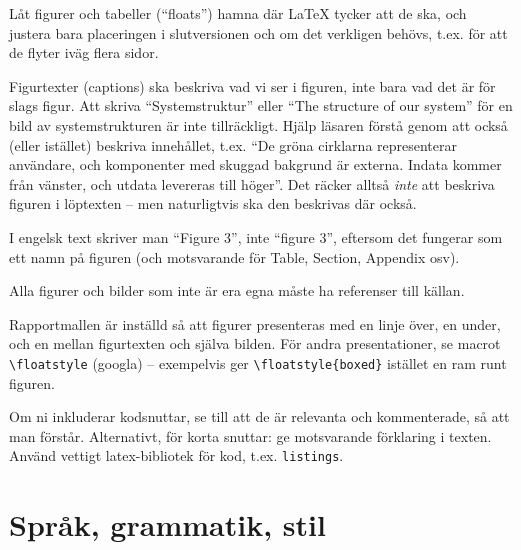 Låt figurer och tabeller (``floats'') hamna där La\TeX{} tycker att de ska, och justera bara placeringen i slutversionen och om det verkligen behövs, t.ex. för att de flyter iväg flera sidor.

Figurtexter (captions) ska beskriva vad vi ser i figuren, inte bara vad det är för slags figur. Att skriva ``Systemstruktur'' eller ``The structure of our system'' för en bild av systemstrukturen är inte tillräckligt. Hjälp läsaren förstå genom att också (eller istället) beskriva innehållet, t.ex. ``De gröna cirklarna representerar användare, och komponenter med skuggad bakgrund är externa. Indata kommer från vänster, och utdata levereras till höger''. Det räcker alltså \emph{inte} att beskriva figuren i löptexten -- men naturligtvis ska den beskrivas där också.

\label{figurers-namn}
I engelsk text skriver man ``Figure 3'', inte ``figure 3'', eftersom det fungerar som ett namn på figuren (och motsvarande för Table, Section, Appendix osv).

Alla figurer och bilder som inte är era egna måste ha referenser till källan.

Rapportmallen är inställd så att figurer presenteras med en linje över, en under, och en mellan figurtexten och själva bilden. För andra presentationer, se macrot \verb|\floatstyle| (googla) -- exempelvis ger \verb|\floatstyle{boxed}| istället en ram runt figuren.

Om ni inkluderar kodsnuttar, se till att de är relevanta och kommenterade, så att man förstår.  Alternativt, för korta snuttar: ge motsvarande förklaring i texten.
Använd vettigt latex-bibliotek för kod, t.ex. \texttt{listings}.

\section{Språk, grammatik, stil}
\label{sec:sprak-och-grammatik}

